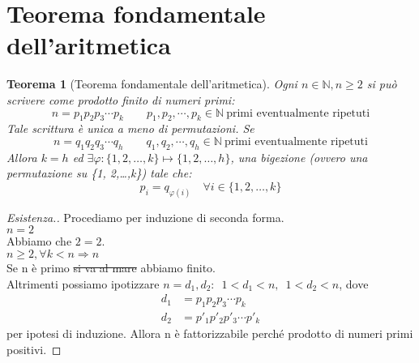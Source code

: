 \documentclass[12pt]{article}
\newcommand{\N}{\mathbb{N}}
\newcommand{\implica}{\Longrightarrow}
\renewcommand\qedsymbol{$\blacksquare$}
\newcommand{\baseinduz}[1]{\\[1\baselineskip]{\boldmath$n = #1$}}
\newcommand{\induzdue}[1]{\\[1\baselineskip]{\boldmath$n \ge #1, \forall k < n \implica n$}}
\newtheorem{theorem}{Teorema}
\begin{document}
\section{Teorema fondamentale dell'aritmetica}
\begin{theorem}[Teorema fondamentale dell'aritmetica]
	Ogni $n \in \N, n \ge 2$ si può scrivere come prodotto finito di numeri primi:
	$$ n = p_1 p_2 p_3 \cdots p_k\qquad p_1, p_2, \cdots, p_k \in \N \ \text{primi eventualmente ripetuti}$$
	Tale scrittura è unica a meno di permutazioni. Se
	$$ n = q_1 q_2 q_3 \cdots q_h\qquad q_1, q_2, \cdots, q_h \in \N \ \text{primi eventualmente ripetuti}$$
	Allora $k = h$ ed $\exists \varphi : \{1, 2,\ldots ,k\} \mapsto \{1, 2, \ldots , h\}$, una bigezione (ovvero una permutazione su \{1, 2,\ldots ,k\}) tale che:
	$$ p_i = q_{\varphi(i)}\quad \forall i \in \{1, 2,\ldots ,k\} $$
\end{theorem}

\renewcommand\qedsymbol{$\square$}
\begin{proof}[Esistenza.]
	Procediamo per induzione di seconda forma.
	\baseinduz{2}
	\\Abbiamo che $ 2 = 2 $.
	\induzdue{2}
	\\Se n è primo \sout{si va al mare} abbiamo finito.
	\\Altrimenti possiamo ipotizzare $n = d_1, d_2 :\enspace1 < d_1 < n,\enspace1 < d_2 < n$, dove
	\begin{align*}
		d_1 & = p_1 p_2 p_3 \cdots p_k     \\
		d_2 & = p'_1 p'_2 p'_3 \cdots p'_k
	\end{align*}
	per ipotesi di induzione. Allora n è fattorizzabile perché prodotto di numeri primi positivi.
\end{proof}
\end{document}
